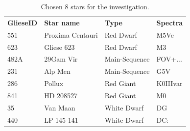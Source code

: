 \documentclass[a4paper]{IEEEtran}
\begin{document}
  \begin{table}[h]
  \begin{center}
    \begin{tabular}{l l l l}
      \textbf{GlieseID} & \textbf{Star name} & \textbf{Type} & \textbf{Spectra}\\
      551 & Proxima Centauri & Red Dwarf & M5Ve\\
      623 & Gliese 623 & Red Dwarf & M3\\
      482A & 29Gam Vir & Main-Sequence & FOV+...\\
      231 & Alp Men & Main-Sequence & G5V\\
      286 & Pollux & Red Giant & K0IIIvar\\
      841 & HD 208527 & Red Giant & M0\\
      35 & Van Maan & White Dwarf & DG\\
      440 & LP 145-141 & White Dwarf & DC:\\
    \end{tabular}
    \caption{Chosen 8 stars for the investigation.}
    \label{stars}
  \end{center}
    \end{table}


















  
  \singlespacing
  \newpage
  \tiny
  \appendix
\end{document}
